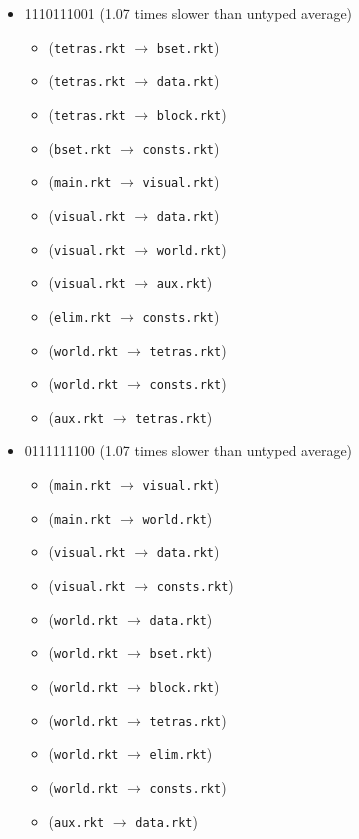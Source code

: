 \documentclass{article}
\newcommand{\mono}[1]{\texttt{#1}}
\begin{document}
\begin{itemize}
\item 1110111001 (1.07 times slower than untyped average)
  \begin{itemize}
  \item (\mono{tetras.rkt} $\rightarrow$ \mono{bset.rkt})
  \item (\mono{tetras.rkt} $\rightarrow$ \mono{data.rkt})
  \item (\mono{tetras.rkt} $\rightarrow$ \mono{block.rkt})
  \item (\mono{bset.rkt} $\rightarrow$ \mono{consts.rkt})
  \item (\mono{main.rkt} $\rightarrow$ \mono{visual.rkt})
  \item (\mono{visual.rkt} $\rightarrow$ \mono{data.rkt})
  \item (\mono{visual.rkt} $\rightarrow$ \mono{world.rkt})
  \item (\mono{visual.rkt} $\rightarrow$ \mono{aux.rkt})
  \item (\mono{elim.rkt} $\rightarrow$ \mono{consts.rkt})
  \item (\mono{world.rkt} $\rightarrow$ \mono{tetras.rkt})
  \item (\mono{world.rkt} $\rightarrow$ \mono{consts.rkt})
  \item (\mono{aux.rkt} $\rightarrow$ \mono{tetras.rkt})
  \end{itemize}
\item 0111111100 (1.07 times slower than untyped average)
  \begin{itemize}
  \item (\mono{main.rkt} $\rightarrow$ \mono{visual.rkt})
  \item (\mono{main.rkt} $\rightarrow$ \mono{world.rkt})
  \item (\mono{visual.rkt} $\rightarrow$ \mono{data.rkt})
  \item (\mono{visual.rkt} $\rightarrow$ \mono{consts.rkt})
  \item (\mono{world.rkt} $\rightarrow$ \mono{data.rkt})
  \item (\mono{world.rkt} $\rightarrow$ \mono{bset.rkt})
  \item (\mono{world.rkt} $\rightarrow$ \mono{block.rkt})
  \item (\mono{world.rkt} $\rightarrow$ \mono{tetras.rkt})
  \item (\mono{world.rkt} $\rightarrow$ \mono{elim.rkt})
  \item (\mono{world.rkt} $\rightarrow$ \mono{consts.rkt})
  \item (\mono{aux.rkt} $\rightarrow$ \mono{data.rkt})

\end{itemize}
\end{itemize}
\end{document}
